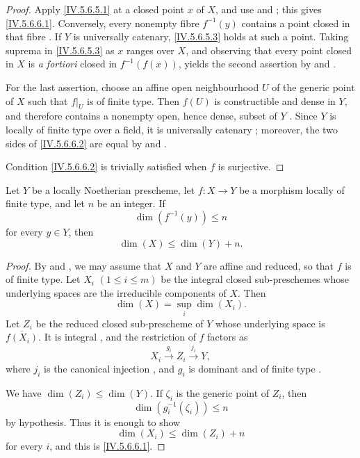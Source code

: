 \begin{proof}
Apply \eqref{IV.5.6.5.1} at a closed point $x$ of $X$, and use
 and ; this gives
\eqref{IV.5.6.6.1}.  Conversely, every nonempty fibre $f^{-1}(y)$
contains a point closed in that fibre .  If $Y$ is
universally catenary, \eqref{IV.5.6.5.3} holds at such a point.
Taking suprema in \eqref{IV.5.6.5.3} as $x$ ranges over $X$, and
observing that every point closed in $X$ is \emph{a fortiori} closed
in $f^{-1}(f(x))$, yields the second assertion by
 and .

For the last assertion, choose an affine open neighbourhood $U$ of
the generic point of $X$ such that $f|_U$ is of finite type.  Then
$f(U)$ is constructible  and dense in $Y$, and
therefore contains a nonempty open, hence dense, subset of $Y$
.  Since $Y$ is locally of finite type over a
field, it is universally catenary ; moreover, the two
sides of \eqref{IV.5.6.6.2} are equal by
 and .

Condition \eqref{IV.5.6.6.2} is trivially satisfied when $f$ is
surjective.
\end{proof}

\begin{corollary}[5.6.7]
\label{IV.5.6.7}
Let $Y$ be a locally Noetherian prescheme, let $f:X\to Y$ be a
morphism locally of finite type, and let $n$ be an integer.  If
\[
\dim(f^{-1}(y))\leq n
\]
for every $y\in Y$, then
\begin{equation}
\dim(X)\leq\dim(Y)+n.
\tag{5.6.7.1}\label{IV.5.6.7.1}
\end{equation}
\end{corollary}

\begin{proof}
By  and , we may assume that $X$
and $Y$ are affine and reduced, so that $f$ is of finite type.
Let $X_i$ $(1\leq i\leq m)$ be the integral closed sub-preschemes
whose underlying spaces are the irreducible components of $X$.
Then
\[
\dim(X)=\sup_i\dim(X_i).
\]
Let $Z_i$ be the reduced closed sub-prescheme of $Y$ whose
underlying space is $\overline{f(X_i)}$.  It is integral
, and the restriction of $f$ factors as
\[
X_i\xrightarrow{g_i}Z_i\xrightarrow{j_i}Y,
\]
where $j_i$ is the canonical injection , and $g_i$
is dominant and of finite type .


We have $\dim(Z_i)\leq\dim(Y)$.  If $\zeta_i$ is the generic point
of $Z_i$, then
\[
\dim(g_i^{-1}(\zeta_i))\leq n
\]
by hypothesis.  Thus it is enough to show
\[
\dim(X_i)\leq\dim(Z_i)+n
\]
for every $i$, and this is \eqref{IV.5.6.6.1}.
\end{proof}

